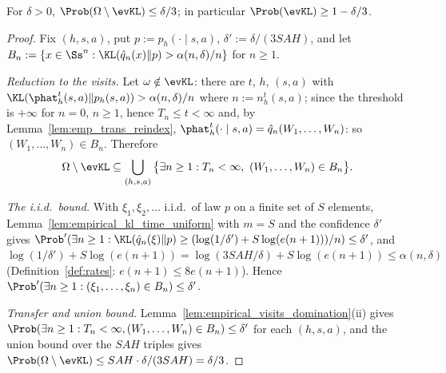 \begin{lemma}\label{lem:event_kl_prob}
\leanok
{}
For $\delta > 0$, $\Prob(\Omega \setminus \evKL) \le \delta/3$; in particular $\Prob(\evKL) \ge 1 - \delta/3$.
\end{lemma}

\begin{proof}
\leanok
Fix $(h, s, a)$, put $p := p_h(\cdot \mid s, a)$, $\delta' := \delta/(3SAH)$, and let
$B_n := \{x \in \Ss^n : \KL(\hat q_n(x) \| p) > \alpha(n, \delta)/n\}$ for $n \ge 1$.

\emph{Reduction to the visits.} Let $\omega \notin \evKL$: there are $t$, $h$, $(s, a)$ with
$\KL(\phat_h^t(s, a) \| p_h(s, a)) > \alpha(n, \delta)/n$ where $n := n_h^t(s, a)$; since the threshold is
$+\infty$ for $n = 0$, $n \ge 1$, hence $T_n \le t < \infty$ and, by Lemma~\ref{lem:emp_trans_reindex},
$\phat_h^t(\cdot \mid s, a) = \hat q_n(W_1, \dots, W_n)$: so $(W_1, \dots, W_n) \in B_n$. Therefore
\[
  \Omega \setminus \evKL \subseteq \bigcup_{(h, s, a)} \big\{\exists n \ge 1 : T_n < \infty,\ (W_1, \dots, W_n) \in B_n\big\} .
\]

\emph{The i.i.d.\ bound.} With $\xi_1, \xi_2, \dots$ i.i.d.\ of law $p$ on a finite set of $S$
elements, Lemma~\ref{lem:empirical_kl_time_uniform} with $m = S$ and the confidence $\delta'$
gives $\Prob'(\exists n \ge 1 : \KL(\hat q_n(\xi) \| p) \ge (\log(1/\delta') + S\log(e(n + 1)))/n) \le \delta'$,
and $\log(1/\delta') + S\log(e(n + 1)) = \log(3SAH/\delta) + S \log(e(n + 1)) \le \alpha(n, \delta)$
(Definition~\ref{def:rates}: $e(n + 1) \le 8e(n + 1)$). Hence
$\Prob'(\exists n \ge 1 : (\xi_1, \dots, \xi_n) \in B_n) \le \delta'$.

\emph{Transfer and union bound.} Lemma~\ref{lem:empirical_visits_domination}(ii) gives
$\Prob(\exists n \ge 1 : T_n < \infty, (W_1, \dots, W_n) \in B_n) \le \delta'$ for each $(h, s, a)$, and
the union bound over the $SAH$ triples gives
$\Prob(\Omega \setminus \evKL) \le SAH \cdot \delta/(3SAH) = \delta/3$.
\end{proof}

